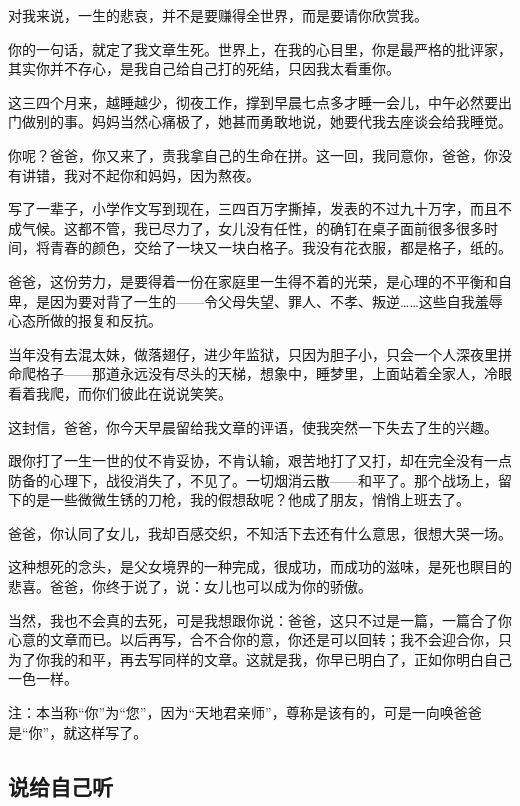 \par 对我来说，一生的悲哀，并不是要赚得全世界，而是要请你欣赏我。
\par 你的一句话，就定了我文章生死。世界上，在我的心目里，你是最严格的批评家，其实你并不存心，是我自己给自己打的死结，只因我太看重你。
\par 这三四个月来，越睡越少，彻夜工作，撑到早晨七点多才睡一会儿，中午必然要出门做别的事。妈妈当然心痛极了，她甚而勇敢地说，她要代我去座谈会给我睡觉。
\par 你呢？爸爸，你又来了，责我拿自己的生命在拼。这一回，我同意你，爸爸，你没有讲错，我对不起你和妈妈，因为熬夜。
\par 写了一辈子，小学作文写到现在，三四百万字撕掉，发表的不过九十万字，而且不成气候。这都不管，我已尽力了，女儿没有任性，的确钉在桌子面前很多很多时间，将青春的颜色，交给了一块又一块白格子。我没有花衣服，都是格子，纸的。
\par 爸爸，这份劳力，是要得着一份在家庭里一生得不着的光荣，是心理的不平衡和自卑，是因为要对背了一生的——令父母失望、罪人、不孝、叛逆……这些自我羞辱心态所做的报复和反抗。
\par 当年没有去混太妹，做落翅仔，进少年监狱，只因为胆子小，只会一个人深夜里拼命爬格子——那道永远没有尽头的天梯，想象中，睡梦里，上面站着全家人，冷眼看着我爬，而你们彼此在说说笑笑。
\par 这封信，爸爸，你今天早晨留给我文章的评语，使我突然一下失去了生的兴趣。
\par 跟你打了一生一世的仗不肯妥协，不肯认输，艰苦地打了又打，却在完全没有一点防备的心理下，战役消失了，不见了。一切烟消云散——和平了。那个战场上，留下的是一些微微生锈的刀枪，我的假想敌呢？他成了朋友，悄悄上班去了。
\par 爸爸，你认同了女儿，我却百感交织，不知活下去还有什么意思，很想大哭一场。
\par 这种想死的念头，是父女境界的一种完成，很成功，而成功的滋味，是死也瞑目的悲喜。爸爸，你终于说了，说：女儿也可以成为你的骄傲。
\par 当然，我也不会真的去死，可是我想跟你说：爸爸，这只不过是一篇，一篇合了你心意的文章而已。以后再写，合不合你的意，你还是可以回转；我不会迎合你，只为了你我的和平，再去写同样的文章。这就是我，你早已明白了，正如你明白自己一色一样。
\par {}
\par 注：本当称“你”为“您”，因为“天地君亲师”，尊称是该有的，可是一向唤爸爸是“你”，就这样写了。



\subsection{说给自己听}

